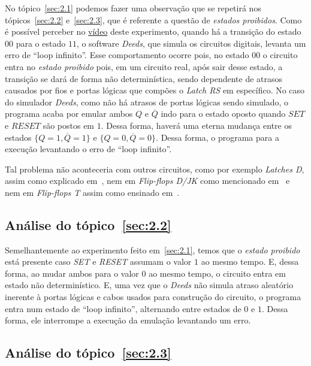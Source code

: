 \documentclass[12pt]{article}
\begin{document}
No tópico~\ref{sec:2.1} podemos fazer uma observação que se repetirá nos
tópicos~\ref{sec:2.2} e~\ref{sec:2.3}, que é referente a questão de
\emph{estados proibidos}. Como é possível perceber no
\href{https://youtu.be/RH6w3QnfUhA}{vídeo} deste experimento, quando há a
transição do estado $00$ para o estado $11$, o software \emph{Deeds}, que simula
os circuitos digitais, levanta um erro de ``loop infinito''. Esse comportamento
ocorre pois, no estado $00$ o circuito entra no \emph{estado proibido} pois, em
um circuito real, após sair desse estado, a transição se dará de forma não
determinística, sendo dependente de atrasos causados por fios e portas lógicas
que compões o \emph{Latch RS} em específico. No caso do simulador \emph{Deeds},
como não há atrasos de portas lógicas sendo simulado, o programa acaba por
emular ambos $Q$ e $\overline{Q}$ indo para o estado oposto quando $SET$ e
$RESET$ são postos em $1$. Dessa forma, haverá uma eterna mudança entre os
estados $\{Q = 1, \overline{Q} = 1\}$ e $\{Q = 0, \overline{Q} = 0\}$. Dessa
forma, o programa para a execução levantando o erro de ``loop infinito''.

Tal problema não aconteceria com outros circuitos, como por exemplo
\emph{Latches D}, assim como explicado em~\cite{cl_latchs_RS_D}, nem em
\emph{Flip-flops D/JK} como mencionado em~\cite{cl_flipflops_RS_D_JK} e nem em
\emph{Flip-flops T} assim como ensinado em~\cite{cl_flipflop_T_clear_preset}.

\subsection{Análise do tópico~\ref{sec:2.2}}\label{sec:analise2.2}

Semelhantemente ao experimento feito em~\ref{sec:2.1}, temos que o \emph{estado
  proibido} está presente caso \emph{SET} e \emph{RESET} assumam o valor $1$ ao
mesmo tempo. E, dessa forma, ao mudar ambos para o valor $0$ ao mesmo tempo, o
circuito entra em estado não determinístico. E, uma vez que o \emph{Deeds} não
simula atraso aleatório inerente à portas lógicas e cabos usados para construção
do circuito, o programa entra num estado de ``loop infinito'', alternando entre
estados de $0$ e $1$. Dessa forma, ele interrompe a execução da emulação
levantando um erro.

\subsection{Análise do tópico~\ref{sec:2.3}}\label{sec:analise2.3}
\end{document}
